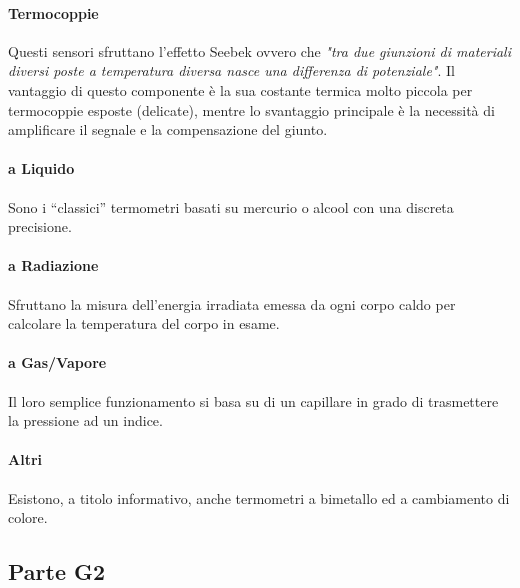 \documentclass[12pt]{article}
\begin{document}
\paragraph{Termocoppie} Questi sensori sfruttano l'effetto Seebek ovvero che \textit{"tra due giunzioni di materiali diversi poste a temperatura diversa nasce una differenza di potenziale"}. Il vantaggio di questo componente è la sua costante termica molto piccola per termocoppie esposte (delicate), mentre lo svantaggio principale è la necessità di amplificare il segnale e la compensazione del giunto.

\paragraph{a Liquido} Sono i ``classici'' termometri basati su mercurio o alcool con una discreta precisione.

\paragraph{a Radiazione} Sfruttano la misura dell'energia irradiata emessa da ogni corpo caldo per calcolare la temperatura del corpo in esame.

\paragraph{a Gas/Vapore} Il loro semplice funzionamento si basa su di un capillare in grado di trasmettere la pressione ad un indice.

\paragraph{Altri} Esistono, a titolo informativo, anche termometri a bimetallo ed a cambiamento di colore.

\subsection{Parte G2}\label{g2} %




\end{document}
